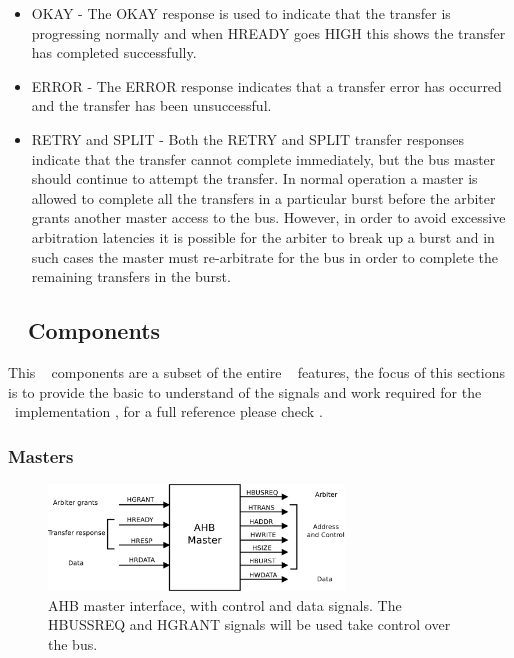 \begin{itemize}

\item  {OKAY -} The OKAY response is used to indicate that the transfer is progressing normally and when HREADY goes HIGH this shows the transfer has completed successfully.
\item {ERROR -} The ERROR response indicates that a transfer error has occurred and the transfer has been unsuccessful.
\item {RETRY and SPLIT  -} Both the RETRY and SPLIT transfer responses indicate that the transfer cannot complete immediately, but the bus master should continue to attempt the transfer. In normal operation a master is allowed to complete all the transfers in a particular burst before the arbiter grants another master access to the bus. However, in order to avoid excessive arbitration latencies it is possible for the arbiter to break up a burst and in such cases the master must re-arbitrate for the bus in order to complete the remaining transfers in the burst.
\end{itemize}


\subsection{\amba~ Components}
This \amba~ components are a  subset of the entire \amba~ features, the focus of this sections is to provide the basic to understand of the signals and work required for the \cshia~implementation , for a full reference please check \cite{ARMAMBA2}.

\subsubsection{Masters}
\begin{figure}[!ht]
    \centering
    \includegraphics[width=0.7\textwidth]{figures/pdf/ahb_master_new.pdf}
    \caption{AHB master interface, with control and data signals. The HBUSSREQ and HGRANT signals  will be used take control over the bus.}
    \label{fig:masterint}
\end{figure}

